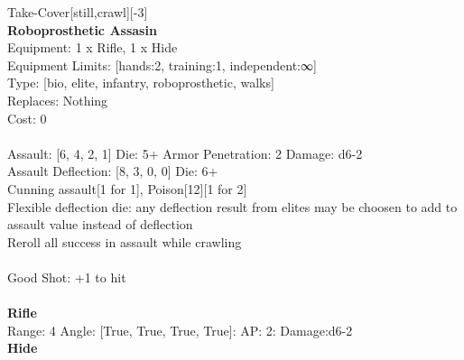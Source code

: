 \noindent Take-Cover[still,crawl][-3]\\ 


{\bf Roboprosthetic Assasin } \\
Equipment: 1 x Rifle, 1 x Hide \\
Equipment Limits: [hands:2, training:1, independent:∞] \\
Type: [bio, elite, infantry, roboprosthetic, walks] \\
Replaces: Nothing \\
Cost: 0\\
\ \\
Assault: [6, 4, 2, 1] Die: 5+ Armor Penetration: 2 Damage: d6-2 \\
Assault Deflection: [8, 3, 0, 0] Die: 6+\\
\indent Cunning assault[1 for 1], Poison[12][1 for 2]\\ 
Flexible deflection die: any deflection result from elites may be choosen to add to assault value instead of deflection\\ 
Reroll all success in assault while crawling\\ 
 
\ \\
Good Shot: +1 to hit\\ 

\ \\
{\bf Rifle } \\



Range: 4  Angle: [True, True, True, True]: AP: 2: Damage:d6-2 \\




{\bf Hide } \\

